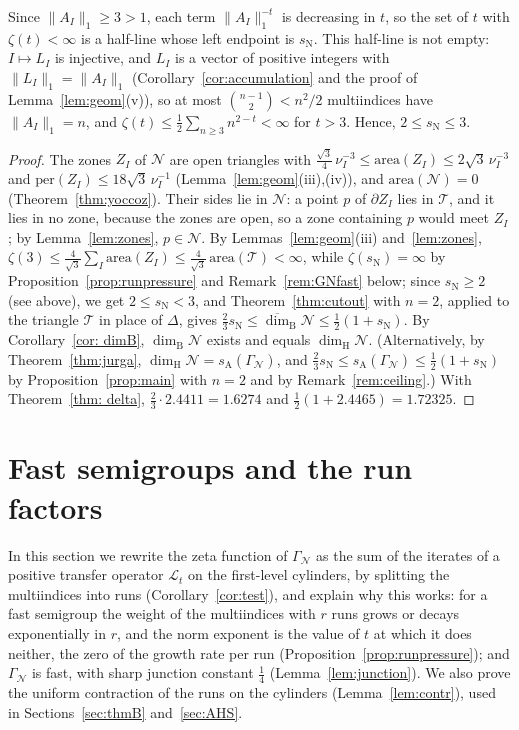 \documentclass[11pt]{amsart}
\theoremstyle{definition}
\theoremstyle{remark}
\newcommand{\cN}{\mathcal N}
\newcommand{\cT}{\mathcal T}
\newcommand{\cL}{\mathcal L}
\newcommand{\GN}{\Gamma_{\mathcal N}}
\newcommand{\udimB}{\overline{\dim}_{\mathrm B}}
\newcommand{\sN}{s_{\mathrm N}}
\newcommand{\sA}{s_{\mathrm A}}
\newcommand{\dimH}{\dim_{\mathrm H}}
\newcommand{\dimB}{\dim_{\mathrm B}}
\begin{document}
Since $\|A_I\|_1\ge3>1$, each term $\|A_I\|_1^{-t}$ is decreasing in $t$, so the set of $t$ with $\zeta(t)<\infty$ is a half-line whose left endpoint is $\sN$.
This half-line is not empty: $I\mapsto L_I$ is injective, and $L_I$ is a vector of positive integers with $\|L_I\|_1=\|A_I\|_1$ (Corollary~\ref{cor:accumulation} and the proof of Lemma~\ref{lem:geom}(v)), so at most $\binom{n-1}{2}<n^2/2$ multiindices have $\|A_I\|_1=n$, and
$\zeta(t)\le\frac12\sum_{n\ge3}n^{2-t}<\infty$ for $t>3$.
Hence, $2\leq \sN\le3$.

\thmsN*

\begin{proof}
The zones $Z_I$ of $\cN$ are open triangles with $\frac{\sqrt3}4\,\nu_I^{-3}\le\mathrm{area}(Z_I)\le2\sqrt3\,\nu_I^{-3}$ and $\mathrm{per}(Z_I)\le18\sqrt3\,\nu_I^{-1}$ (Lemma~\ref{lem:geom}(iii),(iv)), and $\mathrm{area}(\cN)=0$ (Theorem~\ref{thm:yoccoz}). Their sides lie in $\cN$: a point $p$ of $\partial Z_I$ lies in $\cT$, and it lies in no zone, because the zones are open, so a zone containing $p$ would meet $Z_I$; by Lemma~\ref{lem:zones}, $p\in\cN$. By Lemmas~\ref{lem:geom}(iii) and~\ref{lem:zones}, $\zeta(3)\le\frac4{\sqrt3}\sum_I\mathrm{area}(Z_I)\le\frac4{\sqrt3}\,\mathrm{area}(\cT)<\infty$, while $\zeta(\sN)=\infty$ by Proposition~\ref{prop:runpressure} and Remark~\ref{rem:GNfast} below; since $\sN\ge2$ (see above), we get $2\le\sN<3$, and Theorem~\ref{thm:cutout} with $n=2$, applied to the triangle $\cT$ in place of $\Delta$, gives $\frac23\sN\le\udimB\cN\le\frac12(1+\sN)$. By Corollary~\ref{cor: dimB}, $\dimB\cN$ exists and equals $\dimH\cN$. (Alternatively, by Theorem~\ref{thm:jurga}, $\dimH\cN=\sA(\GN)$, and $\frac23\sN\le\sA(\GN)\le\frac12(1+\sN)$ by Proposition~\ref{prop:main} with $n=2$ and by Remark~\ref{rem:ceiling}.) With Theorem~\ref{thm: delta}, $\frac23\cdot2.4411=1.6274$ and $\frac12(1+2.4465)=1.72325$.
\end{proof}

\section{Fast semigroups and the run factors}\label{sec:fast}

In this section we rewrite the zeta function of $\GN$ as the sum of the iterates of a positive transfer operator $\cL_t$ on the first-level cylinders, by splitting the multiindices into runs (Corollary~\ref{cor:test}), and explain why this works: for a fast semigroup the weight of the multiindices with $r$ runs grows or decays exponentially in $r$, and the norm exponent is the value of $t$ at which it does neither, the zero of the growth rate per run (Proposition~\ref{prop:runpressure}); and $\GN$ is fast, with sharp junction constant $\frac14$ (Lemma~\ref{lem:junction}). 
We also prove the uniform contraction of the runs on the cylinders (Lemma~\ref{lem:contr}), used in Sections~\ref{sec:thmB} and~\ref{sec:AHS}.
\end{document}
